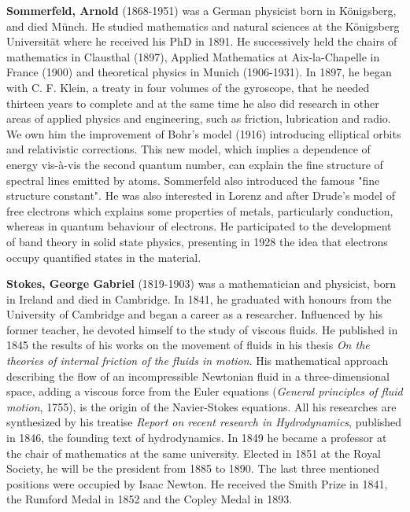 \textbf{Sommerfeld, Arnold} (1868-1951) was a German physicist born in Königsberg, and died Münch. He studied mathematics and natural sciences at the Königsberg Universität where he received his PhD in 1891. He successively held the chairs of mathematics in Clausthal (1897), Applied Mathematics at Aix-la-Chapelle in France (1900) and theoretical physics in Munich (1906-1931). In 1897, he began with C. F. Klein, a treaty in four volumes of the gyroscope, that he needed thirteen years to complete and at the same time he also did research in other areas of applied physics and engineering, such as friction, lubrication and radio. We own him the improvement of Bohr's model (1916) introducing elliptical orbits and relativistic corrections. This new model, which implies a dependence of energy vis-à-vis the second quantum number, can explain the fine structure of spectral lines emitted by atoms. Sommerfeld also introduced the famous "fine structure constant". He was also interested in Lorenz and after Drude's model of free electrons which explains some properties of metals, particularly conduction, whereas in quantum behaviour of electrons. He participated to the development of band theory in solid state physics, presenting in 1928 the idea that electrons occupy quantified states in the material.

\textbf{Stokes, George Gabriel} (1819-1903) was a mathematician and physicist, born in Ireland and died in Cambridge. In 1841, he graduated with honours from the University of Cambridge and began a career as a researcher. Influenced by his former teacher, he devoted himself to the study of viscous fluids. He published in 1845 the results of his works on the movement of fluids in his thesis \textit{On the theories of internal friction of the fluids in motion}. His mathematical approach describing the flow of an incompressible Newtonian fluid in a three-dimensional space, adding a viscous force from the Euler equations (\textit{General principles of fluid motion}, 1755), is the origin of the Navier-Stokes equations. All his researches are synthesized by his treatise \textit{Report on recent research in Hydrodynamics}, published in 1846, the founding text of hydrodynamics. In 1849 he became a professor at the chair of mathematics at the same university. Elected in 1851 at the Royal Society, he will be the president from 1885 to 1890. The last three mentioned positions were occupied by Isaac Newton. He received the Smith Prize in 1841, the Rumford Medal in 1852 and the Copley Medal in 1893.

